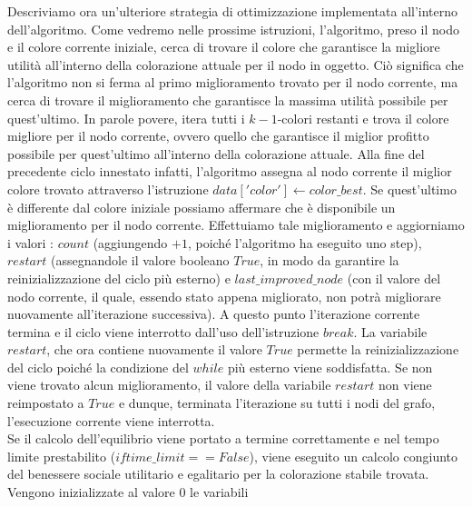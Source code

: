 Descriviamo ora un'ulteriore strategia di ottimizzazione implementata all'interno dell'algoritmo. Come vedremo nelle prossime istruzioni, l'algoritmo, preso il nodo e il colore corrente iniziale, cerca di trovare il colore che garantisce la migliore utilità all'interno della colorazione attuale per il nodo in oggetto. Ciò significa che l'algoritmo non si ferma al primo miglioramento trovato per il nodo corrente, ma cerca di trovare il miglioramento che garantisce la massima utilità possibile per quest'ultimo. In parole povere, itera tutti i $k-1$-colori restanti e trova il colore migliore per il nodo corrente, ovvero quello che garantisce il miglior profitto possibile per quest'ultimo all'interno della colorazione attuale. Alla fine del precedente ciclo innestato infatti, l'algoritmo assegna al nodo corrente il miglior colore trovato attraverso l'istruzione $data['color']\gets color\_best$. Se quest'ultimo è differente dal colore iniziale possiamo affermare che è disponibile un miglioramento per il nodo corrente. Effettuiamo tale miglioramento e aggiorniamo i valori : $count$ (aggiungendo $+1$, poiché l'algoritmo ha eseguito uno step), $restart$ (assegnandole il valore booleano $True$, in modo da garantire la reinizializzazione del ciclo più esterno) e $ last\_improved\_node$ (con il valore del nodo corrente, il quale, essendo stato appena migliorato, non potrà migliorare nuovamente all'iterazione successiva). A questo punto l'iterazione corrente termina e il ciclo viene interrotto dall'uso dell'istruzione $break$. La variabile $restart$, che ora contiene nuovamente il valore $True$ permette la reinizializzazione del ciclo poiché la condizione del $while$ più esterno viene soddisfatta. Se non viene trovato alcun miglioramento, il valore della variabile $restart$ non viene reimpostato a $True$ e dunque, terminata l'iterazione su tutti i nodi del grafo, l'esecuzione corrente viene interrotta.\\
Se il calcolo dell'equilibrio viene portato a termine correttamente e nel tempo limite prestabilito ($if time\_limit == False$), viene eseguito un calcolo congiunto del benessere sociale utilitario e egalitario per la colorazione stabile trovata. Vengono inizializzate al valore $0$ le variabili\\
